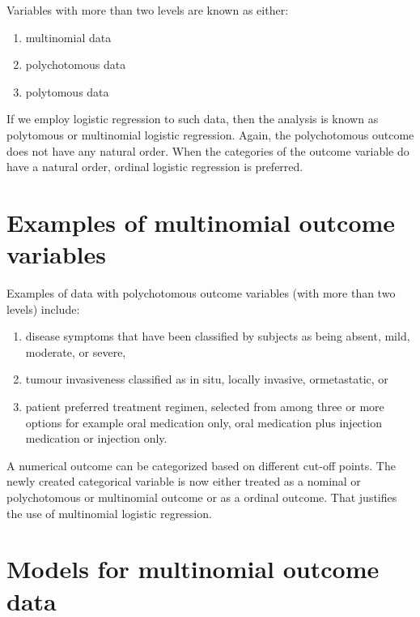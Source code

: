 \documentclass[
  10pt,
]{krantz}
\providecommand{\tightlist}{%
  \setlength{\itemsep}{0pt}\setlength{\parskip}{0pt}}
\begin{document}
Variables with more than two levels are known as either:

\begin{enumerate}
\def\labelenumi{\arabic{enumi}.}
\tightlist
\item
  multinomial data
\item
  polychotomous data
\item
  polytomous data
\end{enumerate}

If we employ logistic regression to such data, then the analysis is known as polytomous or multinomial logistic regression. Again, the polychotomous outcome does not have any natural order. When the categories of the outcome variable do have a natural order, ordinal logistic regression is preferred.

\hypertarget{examples-of-multinomial-outcome-variables}{%
\section{\texorpdfstring{Examples of multinomial outcome variables}{Examples of multinomial outcome variables}}\label{examples-of-multinomial-outcome-variables}}

Examples of data with polychotomous outcome variables (with more than two levels) include:

\begin{enumerate}
\def\labelenumi{\arabic{enumi}.}
\tightlist
\item
  disease symptoms that have been classified by subjects as being absent, mild, moderate, or severe,
\item
  tumour invasiveness classified as in situ, locally invasive, ormetastatic, or
\item
  patient preferred treatment regimen, selected from among three or more options for example oral medication only, oral medication plus injection medication or injection only.
\end{enumerate}

A numerical outcome can be categorized based on different cut-off points. The newly created categorical variable is now either treated as a nominal or polychotomous or multinomial outcome or as a ordinal outcome. That justifies the use of multinomial logistic regression.

\hypertarget{models-for-multinomial-outcome-data}{%
\section{Models for multinomial outcome data}\label{models-for-multinomial-outcome-data}}
\end{document}
